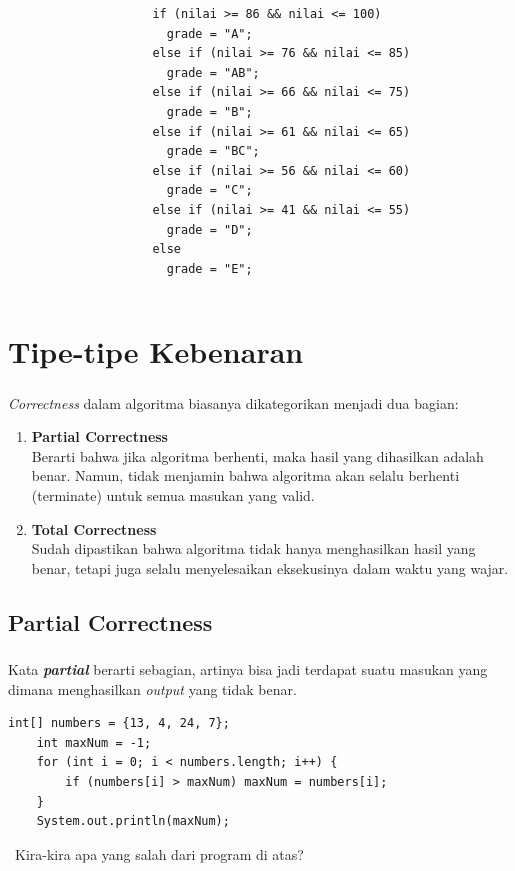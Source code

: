 \documentclass{../praktikum-ppt}
\begin{document}
\begin{frame}[fragile]
\begin{columns}
\begin{column}{0.3\textwidth}
        \end{column}
        \begin{column}{0.6\textwidth}
          \begin{lstlisting}
    if (nilai >= 86 && nilai <= 100) 
      grade = "A";
    else if (nilai >= 76 && nilai <= 85) 
      grade = "AB";
    else if (nilai >= 66 && nilai <= 75) 
      grade = "B";
    else if (nilai >= 61 && nilai <= 65) 
      grade = "BC";
    else if (nilai >= 56 && nilai <= 60) 
      grade = "C";
    else if (nilai >= 41 && nilai <= 55) 
      grade = "D";
    else 
      grade = "E";
          \end{lstlisting}
        \end{column}
      \end{columns}
    \end{frame}

    \section{Tipe-tipe Kebenaran}

    \begin{frame}
      \frametitle{\insertsection}
      \textit{Correctness} dalam algoritma biasanya dikategorikan menjadi dua bagian:
      \begin{enumerate}
        \item \textbf{Partial Correctness}\\
        Berarti bahwa jika algoritma berhenti, maka hasil yang dihasilkan adalah benar. Namun, tidak menjamin bahwa algoritma akan selalu berhenti (terminate) untuk semua masukan yang valid.
        \item \textbf{Total Correctness}\\
        Sudah dipastikan bahwa algoritma tidak hanya menghasilkan hasil yang benar, tetapi juga selalu menyelesaikan eksekusinya dalam waktu yang wajar.
      \end{enumerate}
    \end{frame}

    \subsection{Partial Correctness}
    \begin{frame}[fragile]
      \frametitle{\insertsection}
      \framesubtitle{\insertsubsection}
      Kata \textbf{\textit{partial}} berarti sebagian, artinya bisa jadi terdapat suatu masukan yang dimana menghasilkan \textit{output} yang tidak benar.
      \begin{lstlisting}[caption={Nilai Maksimum Array (\textit{partial})}]
    int[] numbers = {13, 4, 24, 7};
    int maxNum = -1;
    for (int i = 0; i < numbers.length; i++) { 
        if (numbers[i] > maxNum) maxNum = numbers[i];  
    }
    System.out.println(maxNum);
      \end{lstlisting}
      \begin{exampleblock}{$\,$}
        Kira-kira apa yang salah dari program di atas?
      \end{exampleblock}
    \end{frame}
\end{document}
